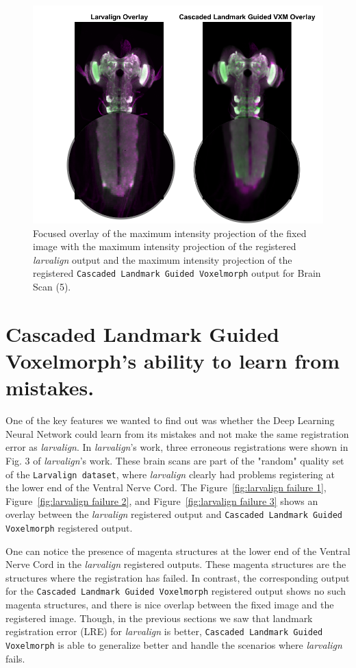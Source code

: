 \documentclass{book}
\begin{document}
	\begin{figure}[h!]
		\centering
		\includegraphics[width=0.75\columnwidth]{resources/Chapter7/LRE_Visual/14c08c_overlay_zoomed.png}
		\caption{Focused overlay of the maximum intensity projection of the fixed image with the maximum intensity projection of the registered \textit{larvalign} output and the maximum intensity projection of the registered \texttt{Cascaded Landmark Guided Voxelmorph} output for Brain Scan (5).}
		\label{fig:14c08c_overlay}
	\end{figure}
	
	\section{Cascaded Landmark Guided Voxelmorph's ability to learn from mistakes.}
	One of the key features we wanted to find out was whether the Deep Learning Neural Network could learn from its mistakes and not make the same registration error as \textit{larvalign}. In \emph{larvalign}'s work, three erroneous registrations were shown in Fig. 3 of \textit{larvalign}'s work. These brain scans are part of the "random" quality set of the \texttt{Larvalign dataset}, where \textit{larvalign} clearly had problems registering at the lower end of the Ventral Nerve Cord. The Figure~\ref{fig:larvalign failure 1}, Figure~\ref{fig:larvalign failure 2}, and Figure~\ref{fig:larvalign failure 3} shows an overlay between the \textit{larvalign} registered output and \texttt{Cascaded Landmark Guided Voxelmorph} registered output.
	
	One can notice the presence of magenta structures at the lower end of the Ventral Nerve Cord in the \textit{larvalign} registered outputs. These magenta structures are the structures where the registration has failed. In contrast, the corresponding output for the \texttt{Cascaded Landmark Guided Voxelmorph} registered output shows no such magenta structures, and there is nice overlap between the fixed image and the registered image. Though, in the previous sections we saw that landmark registration error (LRE) for \textit{larvalign} is better, \texttt{Cascaded Landmark Guided Voxelmorph} is able to generalize better and handle the scenarios where \textit{larvalign} fails.
	
\end{document}
